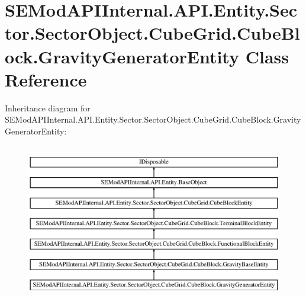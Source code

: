\hypertarget{class_s_e_mod_a_p_i_internal_1_1_a_p_i_1_1_entity_1_1_sector_1_1_sector_object_1_1_cube_grid_1_152f45445d79844991feac643e7a7ab7c}{}\section{S\+E\+Mod\+A\+P\+I\+Internal.\+A\+P\+I.\+Entity.\+Sector.\+Sector\+Object.\+Cube\+Grid.\+Cube\+Block.\+Gravity\+Generator\+Entity Class Reference}
\label{class_s_e_mod_a_p_i_internal_1_1_a_p_i_1_1_entity_1_1_sector_1_1_sector_object_1_1_cube_grid_1_152f45445d79844991feac643e7a7ab7c}
Inheritance diagram for S\+E\+Mod\+A\+P\+I\+Internal.\+A\+P\+I.\+Entity.\+Sector.\+Sector\+Object.\+Cube\+Grid.\+Cube\+Block.\+Gravity\+Generator\+Entity\+:\begin{figure}[H]
\begin{center}
\leavevmode
\includegraphics[height=7.000000cm]{class_s_e_mod_a_p_i_internal_1_1_a_p_i_1_1_entity_1_1_sector_1_1_sector_object_1_1_cube_grid_1_152f45445d79844991feac643e7a7ab7c}
\end{center}
\end{figure}

